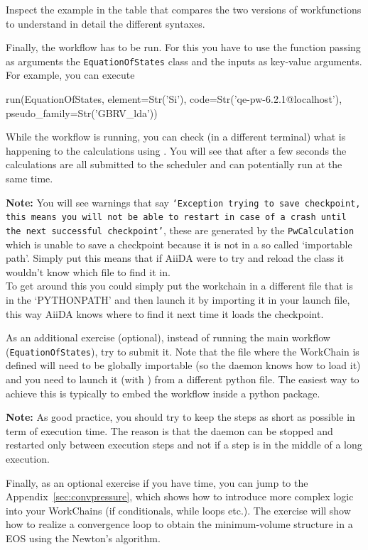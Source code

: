 Inspect the example in the table that compares the two versions of workfunctions to understand in detail the different syntaxes.

Finally, the workflow has to be run. For this you have to use the function  passing as arguments the \texttt{EquationOfStates} class and the inputs as key-value arguments. For example, you can execute

\begin{pythoncommand}
 run(EquationOfStates, element=Str('Si'), code=Str('qe-pw-6.2.1@localhost'),
     pseudo_family=Str('GBRV_lda'))
\end{pythoncommand}

While the workflow is running, you can check (in a different terminal) what is happening
to the calculations using . You will see that after a few seconds the calculations are all submitted to the scheduler and can potentially run at the same time.

\begin{tcolorbox}
\textbf{Note:}
You will see warnings that say \texttt{`Exception trying to save checkpoint, this means you will not be able to restart in case of a crash until the next successful checkpoint'}, these are generated by the \texttt{PwCalculation} which is unable to save a checkpoint because it is not in a so called `importable path'.  Simply put this means that if AiiDA were to try and reload the class it wouldn't know which file to find it in.\\
To get around this you could simply put the workchain in a different file that is in the `PYTHONPATH' and then launch it by importing it in your launch file, this way AiiDA knows where to find it next time it loads the checkpoint.
\end{tcolorbox}

As an additional exercise (optional), instead of running the main workflow (\texttt{EquationOfStates}),
try to submit it. Note that the file where the WorkChain is defined will need to be globally importable (so the daemon knows how to load it) and you need to launch it (with ) from a different python file. The easiest way to achieve this is typically to embed the workflow inside a python package.

\begin{tcolorbox}
\textbf{Note:} 
As good practice, you should try to keep the steps as short as possible in term of execution time. The reason is that the daemon can be stopped and restarted only between execution steps and not if a step is in the middle of a long execution.
\end{tcolorbox}

Finally, as an optional exercise if you have time, you can jump to the Appendix~\ref{sec:convpressure}, which shows how to introduce more complex logic into your WorkChains (if conditionals, while loops etc.). The exercise will show how to realize a convergence loop to obtain the minimum-volume structure in a EOS using the Newton's algorithm.